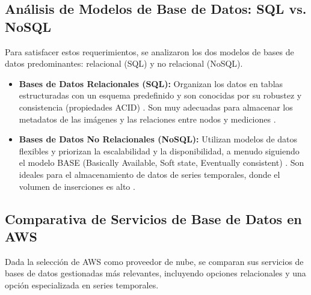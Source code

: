\subsection{Análisis de Modelos de Base de Datos: SQL vs. NoSQL}
\label{subsec:modelos_db}

Para satisfacer estos requerimientos, se analizaron los dos modelos de bases de datos predominantes: relacional (SQL) y no relacional (NoSQL).

\begin{itemize}
    \item \textbf{Bases de Datos Relacionales (SQL):} Organizan los datos en tablas estructuradas con un esquema predefinido y son conocidas por su robustez y consistencia (propiedades ACID) \cite{oracle2024sql}. Son muy adecuadas para almacenar los metadatos de las imágenes y las relaciones entre nodos y mediciones \cite{mongodb2024sqlvsnosql}.
    \item \textbf{Bases de Datos No Relacionales (NoSQL):} Utilizan modelos de datos flexibles y priorizan la escalabilidad y la disponibilidad, a menudo siguiendo el modelo BASE (Basically Available, Soft state, Eventually consistent) \cite{mongodb2024sqlvsnosql}. Son ideales para el almacenamiento de datos de series temporales, donde el volumen de inserciones es alto \cite{aws2024sqlvsnosql}.
\end{itemize}

\subsection{Comparativa de Servicios de Base de Datos en AWS}
\label{subsec:comparativa_db_aws}

Dada la selección de AWS como proveedor de nube, se comparan sus servicios de bases de datos gestionadas más relevantes, incluyendo opciones relacionales y una opción especializada en series temporales.


